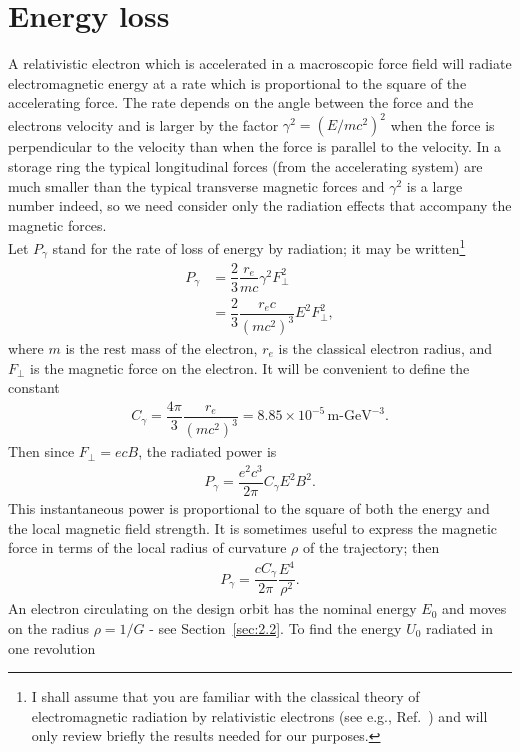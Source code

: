 \section{Energy loss}\label{sec:4.1}

A relativistic electron which is accelerated in a macroscopic force field will radiate electromagnetic energy at a rate which is proportional to the square of the accelerating
 force. The rate depends on the angle between the force and the electrons velocity and is larger by the factor $\gamma^2 = (E/mc^2)^2$ when the force is perpendicular to the velocity than when the force is parallel to the velocity. In a storage ring the typical longitudinal forces (from the accelerating system) are much smaller than the typical transverse magnetic forces and $\gamma^2$ is a large number indeed, so we need consider only the radiation effects that accompany the magnetic forces.\\
Let $P_\gamma$ stand for the rate of loss of energy by radiation; it may be written\footnote{I shall assume that you are familiar with the classical theory of electromagnetic radiation by relativistic electrons (see e.g., Ref.~\cite{10}) and will only review briefly the results needed for our purposes.}
\begin{align}
	P_\gamma &= \dfrac{2}{3} \dfrac{r_e}{m c} \gamma^2 F_\perp^2 \nonumber \\
    	&= \dfrac{2}{3} \dfrac{r_e c}{(m c^2)^3} E^2 F_\perp^2,
\end{align}
where $m$ is the rest mass of the electron, $r_e$ is the classical electron radius, and $F_\perp$ is the magnetic force on the electron. It will be convenient to define the constant
\begin{align} \label{eq:4.2}
	C_\gamma = \dfrac{4 \pi}{3} \dfrac{r_e}{(m c^2)^3} = 8.85 \times 10^{-5}\, \text{m-GeV}^{-3}.
\end{align}
Then since $F_\perp = ecB$, the radiated power is
\begin{align} \label{eq:4.3}
	P_\gamma = \dfrac{e^2 c^3}{2 \pi} C_\gamma E^2 B^2.
\end{align}
This instantaneous power is proportional to the square of both the energy and the local magnetic field strength. It is sometimes useful to express the magnetic force in terms of the local radius of curvature $\rho$ of the trajectory; then
\begin{align} \label{eq:4.4}
	P_\gamma = \dfrac{c C_\gamma}{2 \pi}\dfrac{E^4}{\rho^2}.
\end{align}
An electron circulating on the design orbit has the nominal energy $E_0$ and moves on the radius $\rho = 1/G$ - see Section~\ref{sec:2.2}. To find the energy $U_0$ radiated in one revolution
